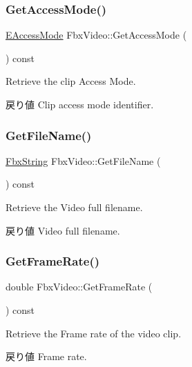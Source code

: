 \subsubsection{\texorpdfstring{Get\+Access\+Mode()}{GetAccessMode()}}
{\footnotesize\ttfamily \hyperlink{class_fbx_video_a6dd88dabb2170adcd8c58952ed2e0c40}{E\+Access\+Mode} Fbx\+Video\+::\+Get\+Access\+Mode (\begin{DoxyParamCaption}{ }\end{DoxyParamCaption}) const}

Retrieve the clip Access Mode. \begin{DoxyReturn}{戻り値}
Clip access mode identifier. 
\end{DoxyReturn}
\mbox{\label{class_fbx_video_a96fc2a11e4e7ca89230389bb55ca5466}} 
\subsubsection{\texorpdfstring{Get\+File\+Name()}{GetFileName()}}
{\footnotesize\ttfamily \hyperlink{class_fbx_string}{Fbx\+String} Fbx\+Video\+::\+Get\+File\+Name (\begin{DoxyParamCaption}{ }\end{DoxyParamCaption}) const}

Retrieve the Video full filename. \begin{DoxyReturn}{戻り値}
Video full filename. 
\end{DoxyReturn}
\mbox{\label{class_fbx_video_afa17b30dbcff2e23fe507585e2688619}} 
\subsubsection{\texorpdfstring{Get\+Frame\+Rate()}{GetFrameRate()}}
{\footnotesize\ttfamily double Fbx\+Video\+::\+Get\+Frame\+Rate (\begin{DoxyParamCaption}{ }\end{DoxyParamCaption}) const}

Retrieve the Frame rate of the video clip. \begin{DoxyReturn}{戻り値}
Frame rate. 
\end{DoxyReturn}
\mbox{\label{class_fbx_video_a47eacfcc9760e1b014cc706795e267fd}} 
